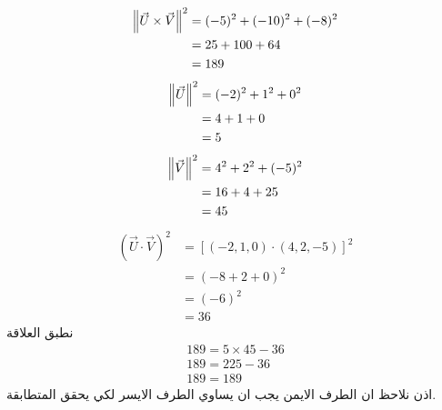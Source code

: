 \begin{align*}
	\left\lVert\vec{U}\times\vec{V}\right\rVert^2 &= (-5)^2 + (-10)^2 + (-8)^2\\
	&= 25 + 100 + 64 \\
	&= 189
\end{align*}
\begin{align*}
	\left\lVert\vec{U}\right\rVert^2 &= (-2)^2 + 1^2 + 0^2\\
	&= 4+1+0\\
	&= 5
\end{align*}
\begin{align*}
	\left\lVert\vec{V}\right\rVert^2 &= 4^2 + 2^2 + (-5)^2\\
	&= 16 + 4 + 25\\
	&= 45
\end{align*}
\begin{align*}
	(\vec{U}\cdot\vec{V})^2 &= [(-2,1,0)\cdot(4,2,-5)]^2\\
	&= (-8+2+0)^2\\
	&= (-6)^2\\
	&= 36
\end{align*}
نطبق العلاقة 
\begin{gather*}
	189 = 5\times 45 - 36\\
	189 = 225 - 36\\
	 189 = 189
\end{gather*}
اذن نلاحظ ان الطرف الايمن يجب ان يساوي الطرف الايسر لكي يحقق المتطابقة.
